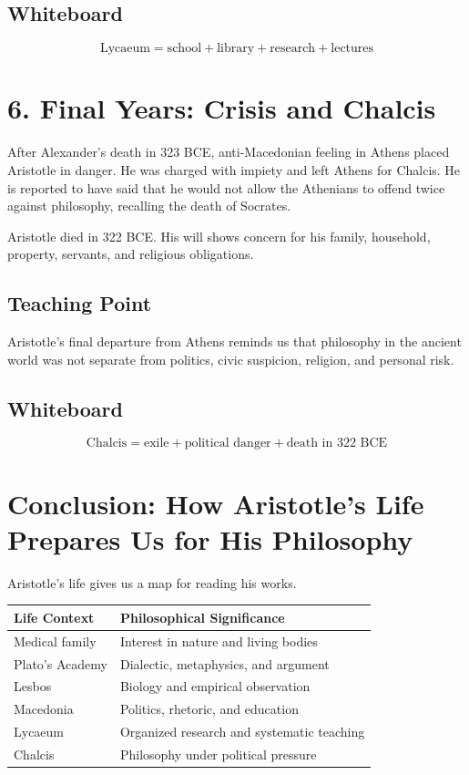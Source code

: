 \documentclass[12pt]{article}
\begin{document}
\subsection*{Whiteboard}

\[
\text{Lycaeum} = \text{school} + \text{library} + \text{research} + \text{lectures}
\]

\section*{6. Final Years: Crisis and Chalcis}

After Alexander's death in 323 BCE, anti-Macedonian feeling in Athens placed
Aristotle in danger. He was charged with impiety and left Athens for Chalcis.
He is reported to have said that he would not allow the Athenians to offend
twice against philosophy, recalling the death of Socrates.

Aristotle died in 322 BCE. His will shows concern for his family, household,
property, servants, and religious obligations.

\subsection*{Teaching Point}

Aristotle's final departure from Athens reminds us that philosophy in the
ancient world was not separate from politics, civic suspicion, religion, and
personal risk.

\subsection*{Whiteboard}

\[
\text{Chalcis} = \text{exile} + \text{political danger} + \text{death in 322 BCE}
\]

\section*{Conclusion: How Aristotle's Life Prepares Us for His Philosophy}

Aristotle's life gives us a map for reading his works.

\begin{center}
\begin{tabular}{ll}
\textbf{Life Context} & \textbf{Philosophical Significance} \\
\hline
Medical family & Interest in nature and living bodies \\
Plato's Academy & Dialectic, metaphysics, and argument \\
Lesbos & Biology and empirical observation \\
Macedonia & Politics, rhetoric, and education \\
Lycaeum & Organized research and systematic teaching \\
Chalcis & Philosophy under political pressure \\
\end{tabular}
\end{center}
\end{document}
